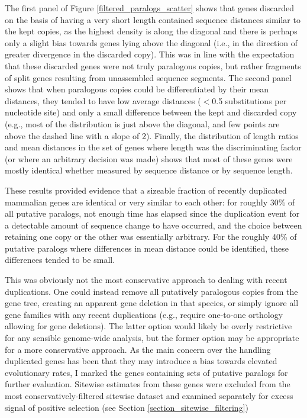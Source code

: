 The first panel of Figure \ref{filtered_paralogs_scatter} shows that
genes discarded on the basis of having a very short length contained
sequence distances similar to the kept copies, as the highest density
is along the diagonal and there is perhaps only a slight bias towards
genes lying above the diagonal (i.e., in the direction of greater
divergence in the discarded copy). This was in line with the
expectation that these discarded genes were not truly paralogous
copies, but rather fragments of split genes resulting from unassembled
sequence segments. The second panel shows that when paralogous copies
could be differentiated by their mean distances, they tended to have
low average distances ($<$0.5 substitutions per nucleotide site) and
only a small difference between the kept and discarded copy (e.g.,
most of the distribution is just above the diagonal, and few points
are above the dashed line with a slope of 2). Finally, the
distribution of length ratios and mean distances in the set of genes
where length was the discriminating factor (or where an arbitrary
decision was made) shows that most of these genes were mostly
identical whether measured by sequence distance or by sequence length.

These results provided evidence that a sizeable fraction of recently
duplicated mammalian genes are identical or very similar to each
other: for roughly 30\% of all putative paralogs, not enough time has
elapsed since the duplication event for a detectable amount of
sequence change to have occurred, and the choice between retaining one
copy or the other was essentially arbitrary. For the roughly 40\% of
putative paralogs where differences in mean distance could be
identified, these differences tended to be small.

This was obviously not the most conservative approach to dealing with
recent duplications. One could instead remove all putatively
paralogous copies from the gene tree, creating an apparent gene
deletion in that species, or simply ignore all gene families with any
recent duplications (e.g., require one-to-one orthology allowing for
gene deletions). The latter option would likely be overly restrictive
for any sensible genome-wide analysis, but the former option may be
appropriate for a more conservative approach. As the main concern over
the handling duplicated genes has been that they may introduce a bias
towards elevated evolutionary rates, I marked the genes containing
sets of putative paralogs for further evaluation. Sitewise estimates
from these genes were excluded from the most conservatively-filtered
sitewise dataset and examined separately for excess signal of positive
selection (see Section \ref{section_sitewise_filtering})

